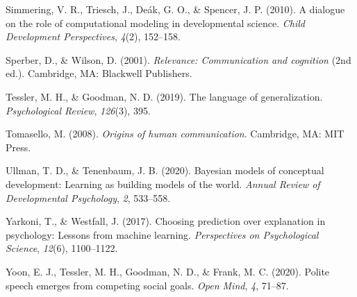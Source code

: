 \documentclass[
  man,mask,floatsintext]{apa6}
\newlength{\cslhangindent}
\newlength{\cslentryspacingunit} %
\newenvironment{CSLReferences}[2] %
 {%
  \setlength{\parindent}{0pt}
  \ifodd #1
  \let\oldpar\par
  \def\par{\hangindent=\cslhangindent\oldpar}
  \fi
  \setlength{\parskip}{#2\cslentryspacingunit}
 }%
 {}
\begin{document}
\begin{CSLReferences}{1}{0}
\leavevmode{}%
Simmering, V. R., Triesch, J., Deák, G. O., \& Spencer, J. P. (2010). A dialogue on the role of computational modeling in developmental science. \emph{Child Development Perspectives}, \emph{4}(2), 152--158.

\leavevmode{}%
Sperber, D., \& Wilson, D. (2001). \emph{Relevance: Communication and cognition} (2nd ed.). Cambridge, MA: Blackwell Publishers.

\leavevmode{}%
Tessler, M. H., \& Goodman, N. D. (2019). The language of generalization. \emph{Psychological Review}, \emph{126}(3), 395.

\leavevmode{}%
Tomasello, M. (2008). \emph{Origins of human communication}. Cambridge, MA: MIT Press.

\leavevmode{}%
Ullman, T. D., \& Tenenbaum, J. B. (2020). Bayesian models of conceptual development: Learning as building models of the world. \emph{Annual Review of Developmental Psychology}, \emph{2}, 533--558.

\leavevmode{}%
Yarkoni, T., \& Westfall, J. (2017). Choosing prediction over explanation in psychology: Lessons from machine learning. \emph{Perspectives on Psychological Science}, \emph{12}(6), 1100--1122.

\leavevmode{}%
Yoon, E. J., Tessler, M. H., Goodman, N. D., \& Frank, M. C. (2020). Polite speech emerges from competing social goals. \emph{Open Mind}, \emph{4}, 71--87.

\end{CSLReferences}

\endgroup
\end{document}
